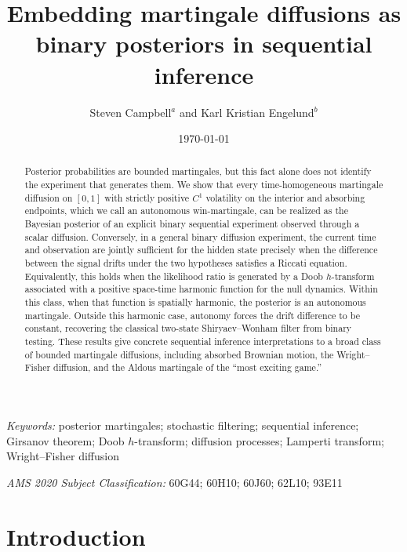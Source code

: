 \documentclass[11pt, reqno]{amsart}
\title[Martingale diffusions as binary posteriors]{Embedding martingale diffusions as binary posteriors in sequential inference}
\author{Steven Campbell$^a$ and Karl Kristian Engelund$^b$}
\date{\today}
\theoremstyle{plain}
\theoremstyle{remark}
\numberwithin{equation}{section}
\begin{document}
\begin{abstract}
Posterior probabilities are bounded martingales, but this fact alone does not identify the experiment that generates them. We show that every time-homogeneous martingale diffusion on $[0,1]$ with strictly positive $C^1$ volatility on the interior and absorbing endpoints, which we call an autonomous win-martingale, can be realized as the Bayesian posterior of an explicit binary sequential experiment observed through a scalar diffusion. Conversely, in a general binary diffusion experiment, the current time and observation are jointly sufficient for the hidden state precisely when the difference between the signal drifts under the two hypotheses satisfies a Riccati equation.  Equivalently, this holds when the likelihood ratio is generated by a Doob $h$-transform associated with a positive space-time harmonic function for the null dynamics. Within this class, when that function is spatially harmonic, the posterior is an autonomous martingale. Outside this harmonic case, autonomy forces the drift difference to be constant, recovering the classical two-state Shiryaev--Wonham filter from binary testing. These results give concrete sequential inference interpretations to a broad class of bounded martingale diffusions, including absorbed Brownian motion, the Wright--Fisher diffusion, and the Aldous martingale of the ``most exciting game.''
\end{abstract}
    
	\maketitle
	\vspace{-0.5cm}
	
	
	{\small\noindent \emph{Keywords:} posterior martingales; stochastic filtering; sequential inference; Girsanov theorem; Doob $h$-transform; diffusion processes; Lamperti transform; Wright--Fisher diffusion}
	
	{\small\noindent \emph{AMS 2020 Subject Classification:} 60G44; 60H10; 60J60; 62L10; 93E11}



\section{Introduction}
\end{document}
